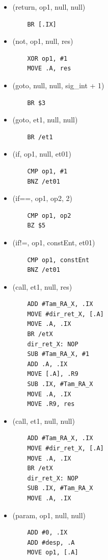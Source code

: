 \documentclass{article}[a4paper]
\begin{document}
\begin{itemize}
\item (return, op1, null, null)
\begin{verbatim}
    BR [.IX]
\end{verbatim}

\item (not, op1, null, res)
\begin{verbatim}
    XOR op1, #1
    MOVE .A, res
\end{verbatim}

\item (goto, null, null, sig\_int + 1)
\begin{verbatim}
    BR $3
\end{verbatim}

\item (goto, et1, null, null)
\begin{verbatim}
    BR /et1
\end{verbatim}

\item (if, op1, null, et01)
\begin{verbatim}
    CMP op1, #1
    BNZ /et01
\end{verbatim}

\item (if==, op1, op2, 2)
\begin{verbatim}
    CMP op1, op2
    BZ $5
\end{verbatim}

\item (if!=, op1, constEnt, et01)
\begin{verbatim}
    CMP op1, constEnt
    BNZ /et01
\end{verbatim}

\item (call, et1, null, res)
\begin{verbatim}
    ADD #Tam_RA_X, .IX
    MOVE #dir_ret_X, [.A] 
    MOVE .A, .IX
    BR /etX
    dir_ret_X: NOP
    SUB #Tam_RA_X, #1
    ADD .A, .IX
    MOVE [.A], .R9
    SUB .IX, #Tam_RA_X
    MOVE .A, .IX
    MOVE .R9, res
\end{verbatim}

\item (call, et1, null, null)
\begin{verbatim}
    ADD #Tam_RA_X, .IX
    MOVE #dir_ret_X, [.A] 
    MOVE .A, .IX
    BR /etX
    dir_ret_X: NOP
    SUB .IX, #Tam_RA_X
    MOVE .A, .IX
\end{verbatim}

\item (param, op1, null, null)
\begin{verbatim}
    ADD #0, .IX
    ADD #desp, .A
    MOVE op1, [.A]
\end{verbatim}

\end{itemize}
\end{document}
